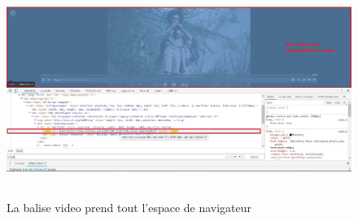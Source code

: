 \documentclass[a4paper, 12pt]{report}
\begin{document}
\begin{figure}[!ht]
\begin{center}
\includegraphics[height=7cm]{images/video.jpg}
\caption{La balise video prend tout l'espace de navigateur}
\label{fig:4.2.1}
\end{center}
\end{figure}
\end{document}
